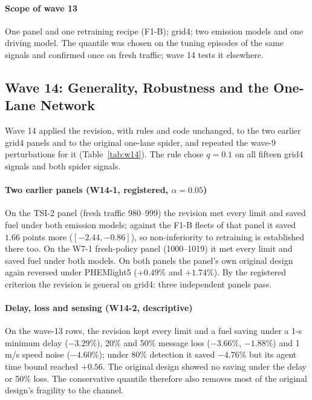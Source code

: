 \paragraph{Scope of wave 13} One panel and one retraining recipe (F1-B); grid4; two emission models and one driving model. The quantile was
chosen on the tuning episodes of the same signals and confirmed once on fresh traffic; wave 14 tests it elsewhere.

\subsection{Wave 14: Generality, Robustness and the One-Lane Network}\label{sec:w14}
Wave 14 applied the revision, with rules and code unchanged, to the two earlier grid4 panels and to the original one-lane spider, and repeated
the wave-9 perturbations for it (Table~\ref{tab:w14}). The rule chose $q=0.1$ on all fifteen grid4 signals and both spider signals.
\paragraph{Two earlier panels (W14-1, registered, $\alpha=0.05$)} On the TSI-2 panel (fresh traffic 980--999) the revision met every
limit and saved fuel under both emission models; against the F1-B fleets of that panel it saved $1.66$ points more ($[-2.44,-0.86]$), so
non-inferiority to retraining is established there too. On the W7-1 fresh-policy panel (1000--1019) it met every limit and saved fuel under
both models. On both panels the panel's own original design again reversed under PHEMlight5 ($+0.49\%$ and $+1.74\%$). By the registered
criterion the revision is general on grid4: three independent panels pass.
\paragraph{Delay, loss and sensing (W14-2, descriptive)} On the wave-13 rows, the revision kept every limit and a fuel saving under a 1-s
minimum delay ($-3.29\%$), 20\% and 50\% message loss ($-3.66\%$, $-1.88\%$) and 1\,m/s speed noise ($-4.60\%$); under 80\% detection it saved
$-4.76\%$ but its agent time bound reached $+0.56$. The original design showed no saving under the delay or 50\% loss. The conservative
quantile therefore also removes most of the original design's fragility to the channel.
